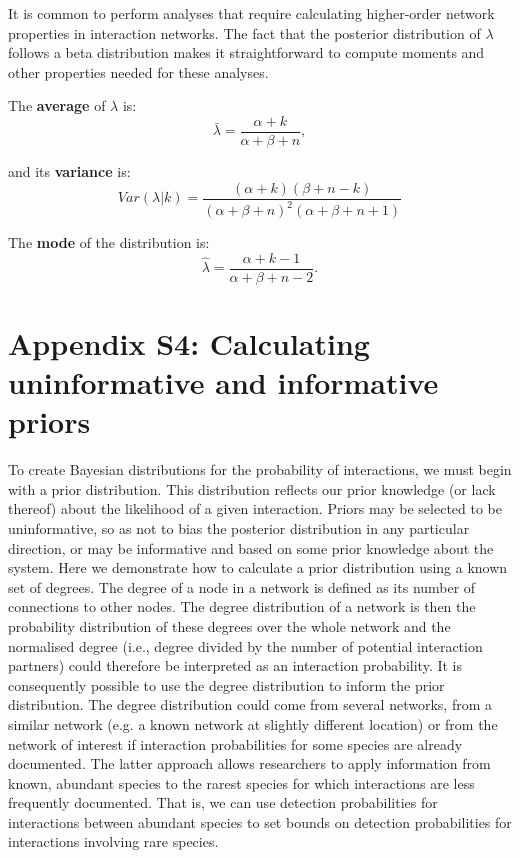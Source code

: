 \documentclass[12pt]{article}
\begin{document}
      It is common to perform analyses that require calculating higher-order network properties in interaction networks. The fact that the posterior distribution of $\lambda$ follows a beta distribution makes it straightforward to compute moments and other properties needed for these analyses. 


      The \textbf{average} of $\lambda$ is: 
          \begin{equation}
            \bar{\lambda} = \frac{\alpha+k}{\alpha+\beta+n} ,
            \label{mean}
          \end{equation}

        and its \textbf{variance} is:  
          \begin{equation}
            Var(\lambda|k) = \frac{(\alpha + k)(\beta + n - k)}{(\alpha + \beta + n)^{2}(\alpha + \beta + n +1)}
            \label{variance}
          \end{equation}

        The \textbf{mode} of the distribution is:
          \begin{equation}
            \hat{\lambda} = \frac{\alpha + k - 1}{\alpha + \beta + n - 2} .
            \label{mode}
          \end{equation}


\clearpage

\section*{Appendix S4: Calculating uninformative and informative priors}

    To create Bayesian distributions for the probability of interactions, we must begin with a prior distribution. This distribution reflects our prior knowledge (or lack thereof) about the likelihood of a given interaction. Priors may be selected to be uninformative, so as not to bias the posterior distribution in any particular direction, or may be informative and based on some prior knowledge about the system. Here we demonstrate how to calculate a prior distribution using a known set of degrees. The degree of a node in a network is defined as its number of connections to other nodes. The degree distribution of a network is then the probability distribution of these degrees over the whole network and the normalised degree (i.e., degree divided by the number of potential interaction partners) could therefore be interpreted as an interaction probability. It is consequently possible to use the degree distribution to inform the prior distribution. The degree distribution could come from several networks, from a similar network (e.g. a known network at slightly different location) or from the network of interest if interaction probabilities for some species are already documented. The latter approach allows researchers to apply information from known, abundant species to the rarest species for which interactions are less frequently documented. That is, we can use detection probabilities for interactions between abundant species to set bounds on detection probabilities for interactions involving rare species.
\end{document}
